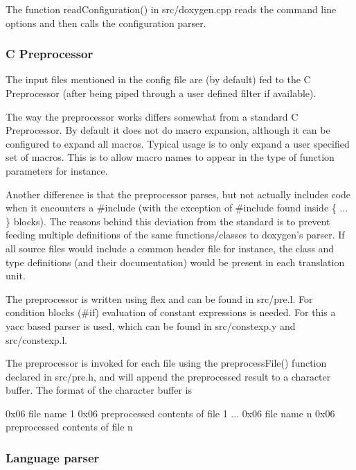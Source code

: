 The function {\ttfamily readConfiguration()} in {\ttfamily src/doxygen.cpp} reads the command line options and then calls the configuration parser.

\subsubsection*{C Preprocessor}

The input files mentioned in the config file are (by default) fed to the C Preprocessor (after being piped through a user defined filter if available).

The way the preprocessor works differs somewhat from a standard C Preprocessor. By default it does not do macro expansion, although it can be configured to expand all macros. Typical usage is to only expand a user specified set of macros. This is to allow macro names to appear in the type of function parameters for instance.

Another difference is that the preprocessor parses, but not actually includes code when it encounters a \#include (with the exception of \#include found inside \{ ... \} blocks). The reasons behind this deviation from the standard is to prevent feeding multiple definitions of the same functions/classes to doxygen's parser. If all source files would include a common header file for instance, the class and type definitions (and their documentation) would be present in each translation unit.

The preprocessor is written using {\ttfamily flex} and can be found in {\ttfamily src/pre.l}. For condition blocks (\#if) evaluation of constant expressions is needed. For this a {\ttfamily yacc} based parser is used, which can be found in {\ttfamily src/constexp.y} and {\ttfamily src/constexp.l}.

The preprocessor is invoked for each file using the {\ttfamily preprocessFile()} function declared in {\ttfamily src/pre.h}, and will append the preprocessed result to a character buffer. The format of the character buffer is

\begin{DoxyVerb}
0x06 file name 1 
0x06 preprocessed contents of file 1
...
0x06 file name n
0x06 preprocessed contents of file n
\end{DoxyVerb}


\subsubsection*{Language parser}

